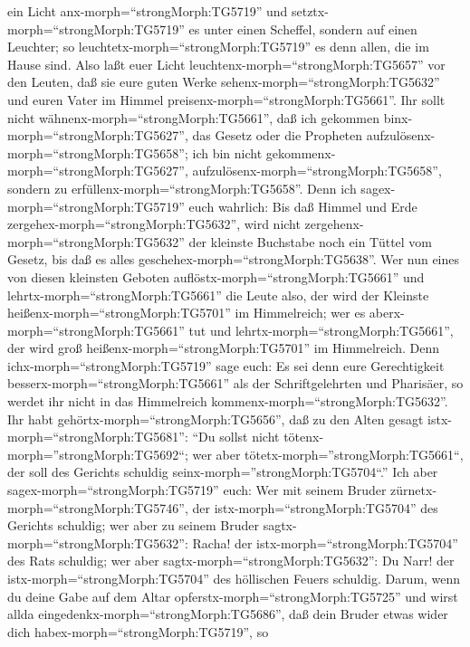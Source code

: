 ein Licht anx-morph=``strongMorph:TG5719'' und
setztx-morph=``strongMorph:TG5719'' es unter einen Scheffel, sondern auf
einen Leuchter; so leuchtetx-morph=``strongMorph:TG5719'' es denn allen,
die im Hause sind.  Also laßt euer Licht
leuchtenx-morph=``strongMorph:TG5657'' vor den Leuten, daß sie eure
guten Werke sehenx-morph=``strongMorph:TG5632'' und euren Vater im
Himmel preisenx-morph=``strongMorph:TG5661''.  Ihr sollt
nicht wähnenx-morph=``strongMorph:TG5661'', daß ich gekommen
binx-morph=``strongMorph:TG5627'', das Gesetz oder die Propheten
aufzulösenx-morph=``strongMorph:TG5658''; ich bin nicht
gekommenx-morph=``strongMorph:TG5627'',
aufzulösenx-morph=``strongMorph:TG5658'', sondern zu
erfüllenx-morph=``strongMorph:TG5658''.  Denn ich
sagex-morph=``strongMorph:TG5719'' euch wahrlich: Bis daß Himmel und
Erde zergehex-morph=``strongMorph:TG5632'', wird nicht
zergehenx-morph=``strongMorph:TG5632'' der kleinste Buchstabe noch ein
Tüttel vom Gesetz, bis daß es alles
geschehex-morph=``strongMorph:TG5638''.  Wer nun eines von
diesen kleinsten Geboten auflöstx-morph=``strongMorph:TG5661'' und
lehrtx-morph=``strongMorph:TG5661'' die Leute also, der wird der
Kleinste heißenx-morph=``strongMorph:TG5701'' im Himmelreich; wer es
aberx-morph=``strongMorph:TG5661'' tut und
lehrtx-morph=``strongMorph:TG5661'', der wird groß
heißenx-morph=``strongMorph:TG5701'' im Himmelreich.  Denn
ichx-morph=``strongMorph:TG5719'' sage euch: Es sei denn eure
Gerechtigkeit besserx-morph=``strongMorph:TG5661'' als der
Schriftgelehrten und Pharisäer, so werdet ihr nicht in das Himmelreich
kommenx-morph=``strongMorph:TG5632''.  Ihr habt
gehörtx-morph=``strongMorph:TG5656'', daß zu den Alten gesagt
istx-morph=``strongMorph:TG5681'': ``Du sollst nicht
tötenx-morph=''strongMorph:TG5692``; wer aber
tötetx-morph=''strongMorph:TG5661``, der soll des Gerichts schuldig
seinx-morph=''strongMorph:TG5704``.''  Ich aber
sagex-morph=``strongMorph:TG5719'' euch: Wer mit seinem Bruder
zürnetx-morph=``strongMorph:TG5746'', der
istx-morph=``strongMorph:TG5704'' des Gerichts schuldig; wer aber zu
seinem Bruder sagtx-morph=``strongMorph:TG5632'': Racha! der
istx-morph=``strongMorph:TG5704'' des Rats schuldig; wer aber
sagtx-morph=``strongMorph:TG5632'': Du Narr! der
istx-morph=``strongMorph:TG5704'' des höllischen Feuers schuldig.
 Darum, wenn du deine Gabe auf dem Altar
opferstx-morph=``strongMorph:TG5725'' und wirst allda
eingedenkx-morph=``strongMorph:TG5686'', daß dein Bruder etwas wider
dich habex-morph=``strongMorph:TG5719'',  so
